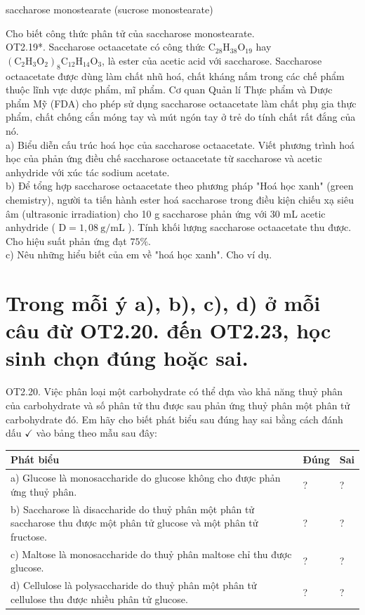 \documentclass[10pt]{article}
\begin{document}
saccharose monostearate (sucrose monostearate)

Cho biết công thức phân tử của saccharose monostearate.\\
OT2.19*. Saccharose octaacetate có công thức $\mathrm{C}_{28} \mathrm{H}_{38} \mathrm{O}_{19}$ hay $\left(\mathrm{C}_{2} \mathrm{H}_{3} \mathrm{O}_{2}\right)_{8} \mathrm{C}_{12} \mathrm{H}_{14} \mathrm{O}_{3}$, là ester của acetic acid với saccharose. Saccharose octaacetate được dùng làm chất nhũ hoá, chất kháng nấm trong các chế phẩm thuộc lĩnh vực dược phẩm, mĩ phẩm. Cơ quan Quản lí Thực phẩm và Dược phẩm Mỹ (FDA) cho phép sử dụng saccharose octaacetate làm chất phụ gia thực phẩm, chất chống cắn móng tay và mút ngón tay ở trẻ do tính chất rất đắng của nó.\\
a) Biểu diễn cấu trúc hoá học của saccharose octaacetate. Viết phương trình hoá học của phản ứng điều chế saccharose octaacetate từ saccharose và acetic anhydride với xúc tác sodium acetate.\\
b) Để tổng hợp saccharose octaacetate theo phương pháp "Hoá học xanh" (green chemistry), người ta tiến hành ester hoá saccharose trong điều kiện chiếu xạ siêu âm (ultrasonic irradiation) cho 10 g saccharose phản ứng với 30 mL acetic anhydride ( $\mathrm{D}=1,08 \mathrm{~g} / \mathrm{mL}$ ). Tính khối lượng saccharose octaacetate thu được. Cho hiệu suất phản ứng đạt $75 \%$.\\
c) Nêu những hiểu biết của em về "hoá học xanh". Cho ví dụ.

\section*{Trong mỗi ý a), b), c), d) ở mỗi câu đừ OT2.20. đến OT2.23, học sinh chọn đúng hoặc sai.}
OT2.20. Việc phân loại một carbohydrate có thể dựa vào khả năng thuỷ phân của carbohydrate và số phân tử thu được sau phản ứng thuỷ phân một phân tử carbohydrate đó. Em hãy cho biết phát biểu sau đúng hay sai bằng cách đánh dấu $\checkmark$ vào bảng theo mẫu sau đây:

\begin{center}
\begin{tabular}{|l|l|l|}
\hline
Phát biểu & Đúng & Sai \\
\hline
a) Glucose là monosaccharide do glucose không cho được phản ứng thuỷ phân. & ? & ? \\
\hline
b) Saccharose là disaccharide do thuỷ phân một phân tử saccharose thu được một phân tử glucose và một phân tử fructose. & ? & ? \\
\hline
c) Maltose là monosaccharide do thuỷ phân maltose chỉ thu được glucose. & ? & ? \\
\hline
d) Cellulose là polysaccharide do thuỷ phân một phân tử cellulose thu được nhiều phân tử glucose. & ? & ? \\
\hline
\end{tabular}
\end{center}
\end{document}
